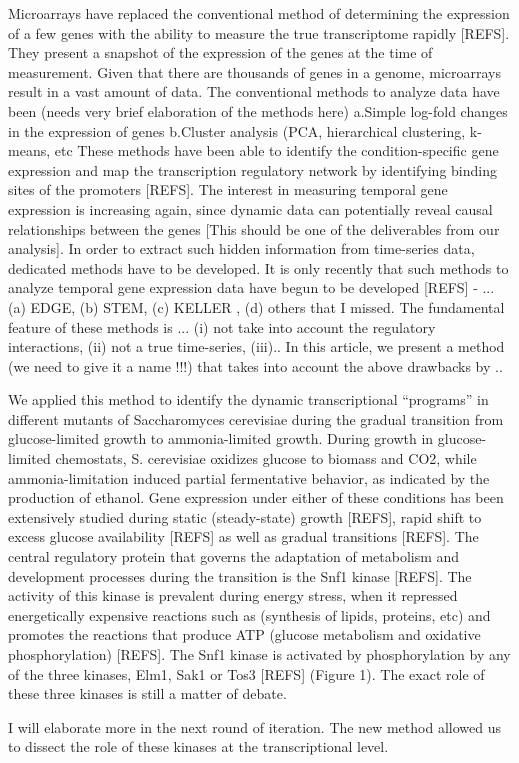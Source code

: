 \documentclass{bioinfo}
\begin{document}
Microarrays have replaced the conventional method of determining the
expression of a few genes with the ability to measure the true
transcriptome rapidly [REFS]. They present a snapshot of the
expression of the genes at the time of measurement. Given that there
are thousands of genes in a genome, microarrays result in a vast
amount of data. The conventional methods to analyze data have been
(needs very brief elaboration of the methods here) a.Simple log-fold
changes in the expression of genes b.Cluster analysis (PCA,
hierarchical clustering, k-means, etc These methods have been able to
identify the condition-specific gene expression and map the
transcription regulatory network by identifying binding sites of the
promoters [REFS]. The interest in measuring temporal gene expression
is increasing again, since dynamic data can potentially reveal causal
relationships between the genes [This should be one of the
deliverables from our analysis]. In order to extract such hidden
information from time-series data, dedicated methods have to be
developed. It is only recently that such methods to analyze temporal
gene expression data have begun to be developed [REFS] - ...(a) EDGE,
(b) STEM, (c) KELLER , (d) others that I missed. The fundamental
feature of these methods is ... (i) not take into account the regulatory
interactions, (ii) not a true time-series, (iii)..  In this article,
we present a method (we need to give it a name !!!) that takes into
account the above drawbacks by ..

We applied this method to identify the dynamic transcriptional
``programs'' in different mutants of Saccharomyces cerevisiae during the
gradual transition from glucose-limited growth to ammonia-limited
growth. During growth in glucose-limited chemostats, S. cerevisiae
oxidizes glucose to biomass and CO2, while ammonia-limitation induced
partial fermentative behavior, as indicated by the production of
ethanol. Gene expression under either of these conditions has been
extensively studied during static (steady-state) growth [REFS], rapid
shift to excess glucose availability [REFS] as well as gradual
transitions [REFS]. The central regulatory protein that governs the
adaptation of metabolism and development processes during the
transition is the Snf1 kinase [REFS]. The activity of this kinase is
prevalent during energy stress, when it repressed energetically
expensive reactions such as (synthesis of lipids, proteins, etc) and
promotes the reactions that produce ATP (glucose metabolism and
oxidative phosphorylation) [REFS]. The Snf1 kinase is activated by
phosphorylation by any of the three kinases, Elm1, Sak1 or Tos3 [REFS]
(Figure 1). The exact role of these three kinases is still a matter of
debate. 
\begin{remark}[Gautham: ]
I will elaborate more in the next round of iteration. The new
method allowed us to dissect the role of these kinases at the
transcriptional level.
\end{remark}
\end{document}
